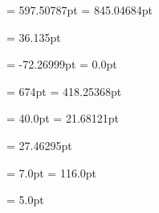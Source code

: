 \usepackage{geometry}			%
\geometry{
    a4paper,					%
    includehead,				%
    includefoot,				%
    twoside,					%
    left=100.0pt
    }



\paperwidth = 597.50787pt 
\paperheight = 845.04684pt

\topmargin = 36.135pt 

\voffset = -72.26999pt
\hoffset = 0.0pt

\textheight = 674pt
\textwidth = 418.25368pt 

\headheight = 40.0pt
\headsep = 21.68121pt 

\footskip = 27.46295pt 

\marginparsep = 7.0pt 
\marginparwidth = 116.0pt 

\marginparpush = 5.0pt 



\usepackage{setspace}		%
\onehalfspacing
